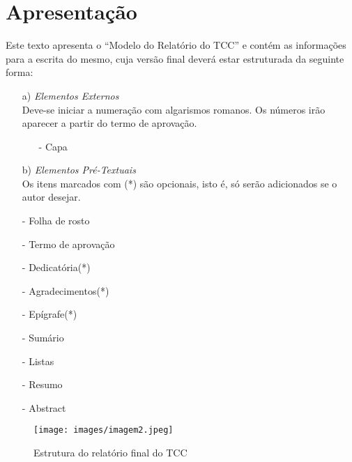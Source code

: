 \documentclass[pnumromarab, normaltoc, a4paper, 12pt]{abnt-unochapeco}
\begin{document}
\section{Apresentação}
Este texto apresenta o ``Modelo do Relatório do TCC'' e contém as informações
para a escrita do mesmo, cuja versão final deverá estar estruturada da seguinte
forma:

\begin{itemize}
  \leading{5mm}
  \item [a)] \emph{Elementos Externos} \\ Deve-se iniciar a numeração com
algarismos romanos. Os números irão aparecer
a partir do termo de aprovação.
  \begin{itemize}
    \item [-] Capa
  \end{itemize}
\end{itemize}

\begin{itemize}
  \leading{5mm}
  \item [b)] \emph{ Elementos Pré-Textuais} \\
  Os itens marcados com (*) são opcionais, isto é, só serão adicionados se o
  autor desejar.
  \item [-] Folha de rosto
  \item [-] Termo de aprovação
  \item [-] Dedicatória(*)
  \item [-] Agradecimentos(*)
  \item [-] Epígrafe(*)
  \item [-] Sumário
  \item [-] Listas
  \item [-] Resumo
  \item [-] Abstract
\end{itemize}

\newpage

\begin{figure}[!h]
  \begin{center}
  \caption{Estrutura do relatório final do TCC}
  \texttt{[image: images/imagem2.jpeg]}
  \end{center}
\end{figure}
\end{document}
